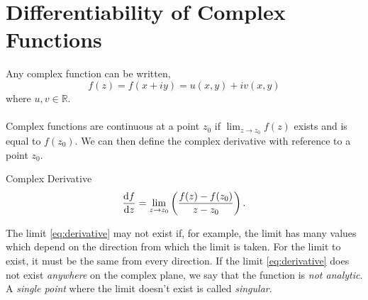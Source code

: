\documentclass{book}
\begin{document}
\section{Differentiability of Complex Functions}
Any complex function can be written,
\begin{equation}
	f(z) = f(x + iy) = u(x,y) + iv(x,y)
\end{equation}
where $u,v \in \mathbb{R}$.
\\\\
Complex functions are continuous at a point $z_0$ if $\lim_{z \to z_0}f(z)$ exists and is equal to $f(z_0)$. We can then define the complex derivative with reference to a point $z_0$.
\begin{Definitions}{Complex Derivative}{}
	\begin{equation}
		\dv{f}{z}(z_0) = \lim_{z \to z_0}\left(\frac{f(z) - f(z_0)}{z - z_0}\right). \label{eq:derivative}
	\end{equation}
\end{Definitions}
The limit \eqref{eq:derivative} may not exist if, for example, the limit has many values which depend on the direction from which the limit is taken. For the limit to exist, it must be the same from every direction. If the limit \eqref{eq:derivative} does not exist \textit{anywhere} on the complex plane, we say that the function is \textit{not analytic}. A \textit{single point} where the limit doesn't exist is called \textit{singular}.
\end{document}
